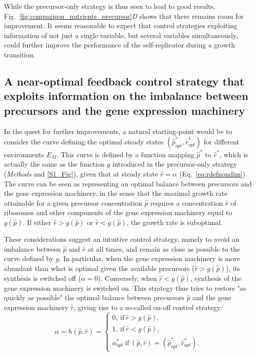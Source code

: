While the precursor-only strategy is thus seen to lead to good results, Fig.~\ref{fig:comparison_nutrients_precursor}\textit{D} shows that there remains room for improvement.
It seems reasonable to expect that control strategies exploiting information of not just a single variable, but several variables simultaneously, could further improve the performance of the self-replicator during a growth transition.


\subsection{A near-optimal feedback control strategy that exploits information on the imbalance between precursors and the gene expression machinery}
\label{sec:strategies}

In the quest for further improvements, a natural starting-point would be to consider the curve defining the optimal steady states $(\hat{p}^*_{opt},\hat{r}^*_{opt})$  for different environments $E_M$.
This curve is defined by a function mapping $\hat{p}^*$ to $\hat{r}^*$, which is actually the same as the function $g$ introduced in the precursor-only strategy (\textit{Methods} and \ref{S1_Fig}), given that at steady state $\hat{r}=\alpha$ (Eq.~\ref{eq:rdefnondim}).
The curve can be seen as representing an optimal balance between precursors and the gene expression machinery, in the sense that the maximal growth rate attainable for a given precursor concentration $\hat{p}$ requires a concentration $\hat{r}$ of ribosomes and other components of the gene expression machinery equal to $g(\hat{p})$. 
If either $\hat{r}>g(\hat{p})$ or $\hat{r}<g(\hat{p})$, the growth rate is suboptimal.

These considerations suggest an intuitive control strategy, namely to avoid an imbalance between $\hat{p}$ and $\hat{r}$ at all times, and remain as close as possible to the curve defined by $g$.
In particular, when the gene expression machinery is more abundant than what is optimal given the available precursors ($\hat{r} > g(\hat{p})$), its synthesis is switched off ($\alpha = 0$).
Conversely, when $\hat{r} < g(\hat{p})$, synthesis of the gene expression machinery is switched on.
This strategy thus tries to restore "as quickly as possible" the optimal balance between precursors $\hat{p}$ and the gene expression machinery $\hat{r}$, giving rise to a so-called on-off control strategy:
\begin{equation}
\label{eq:stratswitch}
\alpha = h(\hat{p},\hat{r}) =
\begin{cases}
0, \ \textrm{if} \ \hat{r} > g(\hat{p}),\\
1, \ \textrm{if} \ \hat{r} < g(\hat{p}), \\
\alpha_{opt}^* \ \textrm{if} \ (\hat{p},\hat{r})=(\hat{p}_{opt}^*,\hat{r}_{opt}^*).
\end{cases}
\end{equation}

